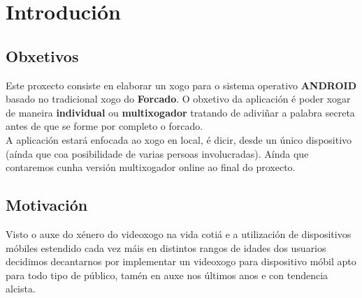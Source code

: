 \chapter{Introdución}
\label{chap:introducion}
\section{Obxetivos}
Este proxecto consiste en elaborar un xogo para o sistema operativo \textbf{ANDROID} basado no tradicional xogo do \textbf{Forcado}. O obxetivo da aplicación é poder xogar de maneira \textbf{individual} ou \textbf{multixogador} tratando de adiviñar a palabra secreta antes de que se forme por completo o forcado.\\
A aplicación estará enfocada ao xogo en local, é dicir, desde un único dispositivo (aínda que coa posibilidade de varias persoas involucradas). Aínda que contaremos cunha versión multixogador online ao final do proxecto.
\section{Motivación}
Visto o auxe do xénero do videoxogo na vida cotiá e a utilización de dispositivos móbiles estendido cada vez máis en distintos rangos de idades dos usuarios decidimos decantarnos por implementar un videoxogo para dispositivo móbil apto para todo tipo de público, tamén en auxe nos últimos anos e con tendencia alcista.


